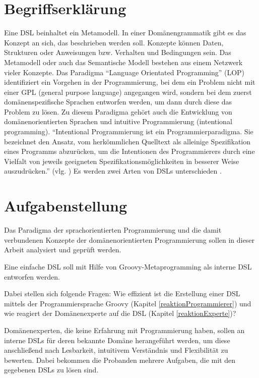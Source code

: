 \documentclass[11pt,english,ngerman, headsepline]{scrreprt}
\begin{document}
\section{Begriffserklärung}
Eine DSL beinhaltet ein Metamodell. In einer Domänengrammatik gibt es das
Konzept an sich, das beschrieben werden soll. Konzepte können Daten, Strukturen
oder Anweisungen bzw. Verhalten und Bedingungen sein. Das Metamodell oder auch
das Semantische Modell bestehen aus einem Netzwerk vieler Konzepte. Das Paradigma
“Language Orientated Programming” (LOP) identifiziert ein Vorgehen in der
Programmierung, bei dem ein Problem nicht mit einer GPL (general purpose
language) angegangen wird, sondern bei dem zuerst domänenspezifische Sprachen
entworfen werden, um dann durch diese das Problem zu lösen. Zu diesem Paradigma
gehört auch die Entwicklung von domänenorientierten Sprachen und intuitive
Programmierung (intentional programming). “Intentional Programmierung ist ein
Programmierparadigma. Sie bezeichnet den Ansatz, vom herkömmlichen Quelltext als
alleinige Spezifikation eines Programms abzurücken, um die Intentionen des
Programmierers durch eine Vielfalt von jeweils geeigneten
Spezifikationsmöglichkeiten in besserer Weise auszudrücken.” (vlg.
\cite{wikiIntentional}) Es werden zwei Arten von DSLs unterschieden
\cite{fowler2011domain}. 


\section{Aufgabenstellung }

Das Paradigma der sprachorientierten Programmierung und die damit verbundenen
Konzepte der domänenorientierten Programmierung sollen in dieser Arbeit
analysiert und geprüft werden. 


Eine einfache DSL soll mit Hilfe von
Groovy-Metaprogramming als interne DSL entworfen werden.


Dabei stellen sich folgende Fragen: Wie effizient ist die Erstellung einer DSL
mittels der Programmiersprache Groovy (Kapitel \ref{reaktionProgrammierer}) und wie
reagiert der Domänenexperte auf die DSL (Kapitel \ref{reaktionExperte})?

Domänenexperten, die keine Erfahrung mit Programmierung haben, sollen an
interne DSLs für deren bekannte Domäne herangeführt werden, um diese
anschließend nach Lesbarkeit, intuitivem Verständnis und Flexibilität zu
bewerten. Dabei bekommen die Probanden mehrere Aufgaben, die mit den
gegebenen DSLs zu lösen sind. 
 
\end{document}
